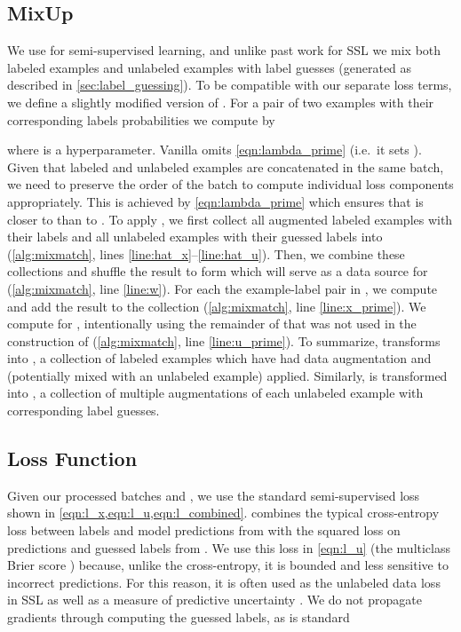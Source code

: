\documentclass{article}
\begin{document}
\subsection{MixUp}

We use  for semi-supervised learning, and unlike past work for SSL we mix both labeled examples and unlabeled examples with label guesses (generated as described in \cref{sec:label_guessing}).
To be compatible with our separate loss terms, we define a slightly modified version of .
For a pair of two examples with their corresponding labels probabilities  we compute  by

where  is a hyperparameter.
Vanilla  omits \cref{eqn:lambda_prime} (i.e.\ it sets ).
Given that labeled and unlabeled examples are concatenated in the same batch, we need to preserve the order of the batch to compute individual loss components appropriately.
This is achieved by \cref{eqn:lambda_prime} which ensures that  is closer to  than to .
To apply , we first collect all augmented labeled examples with their labels and all unlabeled examples with their guessed labels into
 (\cref{alg:mixmatch}, lines \ref{line:hat_x}--\ref{line:hat_u}).
Then, we combine these collections and shuffle the result to form  which will serve as a data source for  (\cref{alg:mixmatch}, line \ref{line:w}).
For each the  example-label pair in , we compute  and add the result to the collection  (\cref{alg:mixmatch}, line \ref{line:x_prime}).
We compute  for , intentionally using the remainder of  that was not used in the construction of  (\cref{alg:mixmatch}, line \ref{line:u_prime}).
To summarize,  transforms  into , a collection of labeled examples which have had data augmentation and  (potentially mixed with an unlabeled example) applied.
Similarly,  is transformed into , a collection of multiple augmentations of each unlabeled example with corresponding label guesses.

\subsection{Loss Function}
\label{sec:loss_function}

Given our processed batches  and , we use the standard semi-supervised loss shown in \cref{eqn:l_x,eqn:l_u,eqn:l_combined}.
 combines the typical cross-entropy loss between labels and model predictions from  with the squared  loss on predictions and guessed labels from .
We use this  loss in \cref{eqn:l_u} (the multiclass Brier score \cite{brier1950verification})  because, unlike the cross-entropy, it is bounded and less sensitive to incorrect predictions.
For this reason, it is often used as the unlabeled data loss in SSL \cite{laine2016temporal,tarvainen2017weight} as well as a measure of predictive uncertainty \cite{lakshminarayanan2017simple}.
We do not propagate gradients through computing the guessed labels, as is standard \cite{laine2016temporal,tarvainen2017weight,miyato2018virtual,oliver2018realistic}
\end{document}
